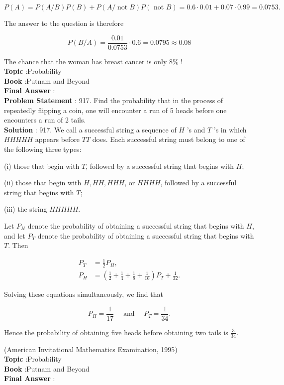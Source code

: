 \documentclass[10pt]{article}
\begin{document}
$$
P(A)=P(A / B) P(B)+P(A / \operatorname{not} B) P(\text { not } B)=0.6 \cdot 0.01+0.07 \cdot 0.99=0.0753 .
$$

The answer to the question is therefore

$$
P(B / A)=\frac{0.01}{0.0753} \cdot 0.6=0.0795 \approx 0.08
$$

The chance that the woman has breast cancer is only $8 \%$ !
\\
\textbf{Topic} :Probability\\
\textbf{Book} :Putnam and Beyond\\
\textbf{Final Answer} :\\


\textbf{Problem Statement} :
917. Find the probability that in the process of repeatedly flipping a coin, one will encounter a run of 5 heads before one encounters a run of 2 tails.
\\
\textbf{Solution} :
917. We call a successful string a sequence of $H$ 's and $T$ 's in which $H H H H H$ appears before $T T$ does. Each successful string must belong to one of the following three types:

(i) those that begin with $T$, followed by a successful string that begins with $H$;

(ii) those that begin with $H, H H, H H H$, or $H H H H$, followed by a successful string that begins with $T$;

(iii) the string $H H H H H$.

Let $P_{H}$ denote the probability of obtaining a successful string that begins with $H$, and let $P_{T}$ denote the probability of obtaining a successful string that begins with $T$. Then

$$
\begin{aligned}
P_{T} &=\frac{1}{2} P_{H}, \\
P_{H} &=\left(\frac{1}{2}+\frac{1}{4}+\frac{1}{8}+\frac{1}{16}\right) P_{T}+\frac{1}{32} .
\end{aligned}
$$

Solving these equations simultaneously, we find that

$$
P_{H}=\frac{1}{17} \quad \text { and } \quad P_{T}=\frac{1}{34} .
$$

Hence the probability of obtaining five heads before obtaining two tails is $\frac{3}{34}$.

(American Invitational Mathematics Examination, 1995)
\\
\textbf{Topic} :Probability\\
\textbf{Book} :Putnam and Beyond\\
\textbf{Final Answer} :\\
\end{document}
